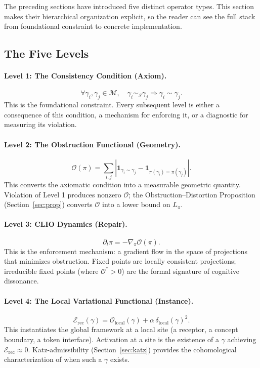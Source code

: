 \documentclass[12pt,a4paper]{article}
\begin{document}
The preceding sections have introduced five distinct operator types. This section makes their hierarchical organization explicit, so the reader can see the full stack from foundational constraint to concrete implementation.

\subsection{The Five Levels}

\paragraph{Level 1: The Consistency Condition (Axiom).}
\[
\forall \gamma_i, \gamma_j \in \mathcal{M}, \quad \gamma_i \sim_{\mathcal{S}} \gamma_j \Rightarrow \gamma_i \sim \gamma_j.
\]
This is the foundational constraint. Every subsequent level is either a consequence of this condition, a mechanism for enforcing it, or a diagnostic for measuring its violation.

\paragraph{Level 2: The Obstruction Functional (Geometry).}
\[
\mathcal{O}(\pi) = \sum_{i,j} \left|\mathbf{1}_{\gamma_i \sim \gamma_j} - \mathbf{1}_{\pi(\gamma_i) = \pi(\gamma_j)}\right|.
\]
This converts the axiomatic condition into a measurable geometric quantity. Violation of Level 1 produces nonzero $\mathcal{O}$; the Obstruction--Distortion Proposition (Section~\ref{sec:prop}) converts $\mathcal{O}$ into a lower bound on $L_\pi$.

\paragraph{Level 3: CLIO Dynamics (Repair).}
\[
\partial_t \pi = -\nabla_\pi \mathcal{O}(\pi).
\]
This is the enforcement mechanism: a gradient flow in the space of projections that minimizes obstruction. Fixed points are locally consistent projections; irreducible fixed points (where $\mathcal{O}^* > 0$) are the formal signature of cognitive dissonance.

\paragraph{Level 4: The Local Variational Functional (Instance).}
\[
\mathcal{E}_{\text{rec}}(\gamma) = \mathcal{O}_{\text{local}}(\gamma) + \alpha\,\delta_{\text{local}}(\gamma)^2.
\]
This instantiates the global framework at a local site (a receptor, a concept boundary, a token interface). Activation at a site is the existence of a $\gamma$ achieving $\mathcal{E}_{\text{rec}} \approx 0$. Katz-admissibility (Section~\ref{sec:katz}) provides the cohomological characterization of when such a $\gamma$ exists.
\end{document}
